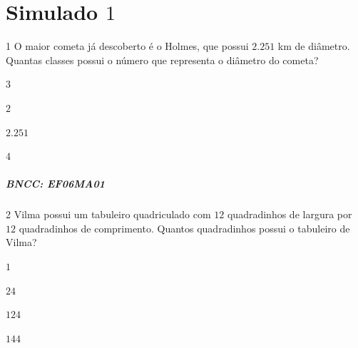 
\chapter{Simulado $1$}

\num{1}  O maior cometa já descoberto é o Holmes, que possui $2.251$ km de
diâmetro. Quantas classes possui o número que representa o diâmetro do cometa?

\begin{escolha}
\item $3$
\item $2$
\item $2.251$
\item $4$
\end{escolha}

\paragraph{BNCC: EF06MA01 }


\num{2}  Vilma possui um tabuleiro quadriculado com $12$ quadradinhos de largura
por $12$ quadradinhos de comprimento. Quantos quadradinhos possui o
tabuleiro de Vilma?

\begin{escolha}
\item $1$
\item $24$
\item $124$
\item $144$
\end{escolha}

